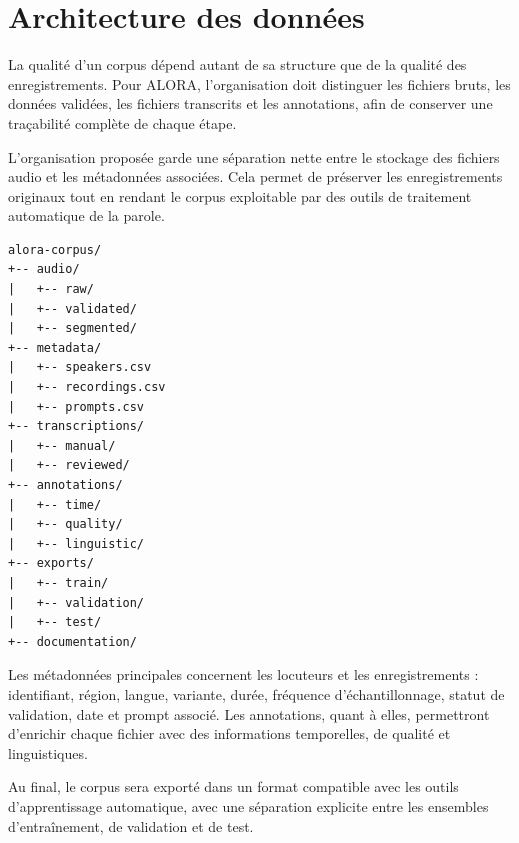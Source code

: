 \section{Architecture des données}

La qualité d'un corpus dépend autant de sa structure que de la qualité des
enregistrements. Pour ALORA, l'organisation doit distinguer les fichiers
bruts, les données validées, les fichiers transcrits et les annotations,
afin de conserver une traçabilité complète de chaque étape.

L'organisation proposée garde une séparation nette entre le stockage des
fichiers audio et les métadonnées associées. Cela permet de préserver les
enregistrements originaux tout en rendant le corpus exploitable par des
outils de traitement automatique de la parole.

\begin{verbatim}
alora-corpus/
+-- audio/
|   +-- raw/
|   +-- validated/
|   +-- segmented/
+-- metadata/
|   +-- speakers.csv
|   +-- recordings.csv
|   +-- prompts.csv
+-- transcriptions/
|   +-- manual/
|   +-- reviewed/
+-- annotations/
|   +-- time/
|   +-- quality/
|   +-- linguistic/
+-- exports/
|   +-- train/
|   +-- validation/
|   +-- test/
+-- documentation/
\end{verbatim}

Les métadonnées principales concernent les locuteurs et les
enregistrements : identifiant, région, langue, variante, durée,
fréquence d'échantillonnage, statut de validation, date et prompt
associé. Les annotations, quant à elles, permettront d'enrichir chaque
fichier avec des informations temporelles, de qualité et linguistiques.

Au final, le corpus sera exporté dans un format compatible avec les
outils d'apprentissage automatique, avec une séparation explicite entre
les ensembles d'entraînement, de validation et de test.
